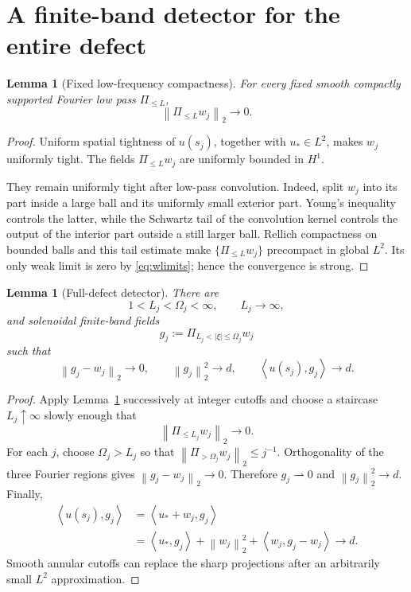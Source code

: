 \documentclass[11pt]{article}
\newtheorem{lemma}[theorem]{Lemma}
\theoremstyle{remark}
\newcommand{\norm}[1]{\left\|#1\right\|}
\newcommand{\ip}[2]{\left\langle#1,#2\right\rangle}
\newcommand{\weakto}{\rightharpoonup}
\begin{document}
\section{A finite-band detector for the entire defect}

\begin{lemma}[Fixed low-frequency compactness]
\label{lem:fixed-low}
For every fixed smooth compactly supported Fourier low pass
\(\Pi_{\leq L}\),
\[
 \norm{\Pi_{\leq L}w_j}_2\longrightarrow0.
\]
\end{lemma}

\begin{proof}
Uniform spatial tightness of \(u(s_j)\), together with
\(u_*\in L^2\), makes \(w_j\) uniformly tight.  The fields
\(\Pi_{\leq L}w_j\) are uniformly bounded in \(H^1\).

They remain uniformly tight after low-pass convolution.  Indeed, split
\(w_j\) into its part inside a large ball and its uniformly small
exterior part.  Young's inequality controls the latter, while the
Schwartz tail of the convolution kernel controls the output of the
interior part outside a still larger ball.  Rellich compactness on
bounded balls and this tail estimate make
\(\{\Pi_{\leq L}w_j\}\) precompact in global \(L^2\).  Its only weak
limit is zero by \eqref{eq:wlimits}; hence the convergence is strong.
\end{proof}

\begin{lemma}[Full-defect detector]
\label{lem:detector}
There are
\[
 1<L_j<\Omega_j<\infty,\qquad L_j\longrightarrow\infty,
\]
and solenoidal finite-band fields
\[
 g_j:=\Pi_{L_j<|\xi|\leq\Omega_j}w_j
\]
such that
\begin{equation}
\label{eq:detector}
 \norm{g_j-w_j}_2\longrightarrow0,\qquad
 \norm{g_j}_2^2\longrightarrow d,\qquad
 \ip{u(s_j)}{g_j}\longrightarrow d.
\end{equation}
\end{lemma}

\begin{proof}
Apply Lemma~\ref{lem:fixed-low} successively at integer cutoffs and
choose a staircase \(L_j\uparrow\infty\) slowly enough that
\[
 \norm{\Pi_{\leq L_j}w_j}_2\longrightarrow0.
\]
For each \(j\), choose \(\Omega_j>L_j\) so that
\(\norm{\Pi_{>\Omega_j}w_j}_2\leq j^{-1}\).
Orthogonality of the three Fourier regions gives
\(\norm{g_j-w_j}_2\to0\).  Therefore
\(g_j\weakto0\) and \(\norm{g_j}_2^2\to d\).
Finally,
\[
\begin{aligned}
 \ip{u(s_j)}{g_j}
 &=
 \ip{u_*+w_j}{g_j}\\
 &=
 \ip{u_*}{g_j}
 +\norm{w_j}_2^2
 +\ip{w_j}{g_j-w_j}
 \longrightarrow d.
\end{aligned}
\]
Smooth annular cutoffs can replace the sharp projections after an
arbitrarily small \(L^2\) approximation.
\end{proof}
\end{document}
